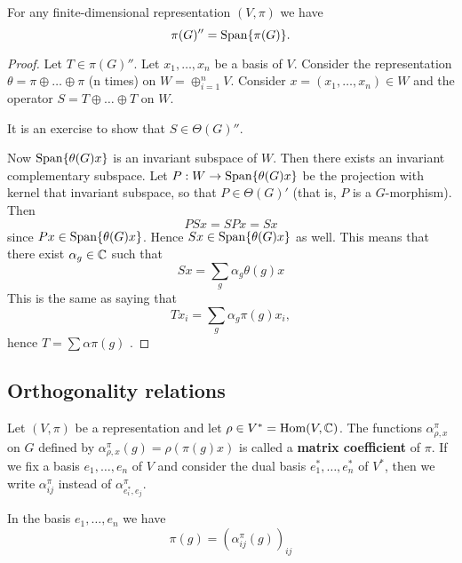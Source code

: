 \documentclass[11pt, english]{article}
\begin{document}
\begin{thm} 
 For any finite-dimensional representation $(V,\pi)$ we have 
\[
\pi(G)'' = \mathrm{Span}\{\pi(G)\}.
\]
\end{thm}
\begin{proof}
Let $T \in \pi(G)''$. Let $x_1,\ldots,x_n$ be a basis of $V$. Consider the representation $\theta = \pi \oplus \ldots \oplus \pi$ (n times) on $W = \oplus_{i=1}^n V$. Consider $x=(x_1,\ldots,x_n) \in W$ and the operator $S = T \oplus \ldots \oplus T$ on $W$. 

It is an exercise to show that $S \in \Theta(G)''$.

Now $\mathrm{Span}\{\theta (G) x \}$ is an invariant subspace of $W$. Then there exists an invariant complementary subspace. Let $P:W \to \mathrm{Span}\{\theta(G)x\}$ be the projection with kernel that invariant subspace, so that $P \in \Theta(G)'$ (that is, $P$ is a $G$-morphism). Then
$$
PSx = SPx = Sx
$$
since $P x \in \mathrm{Span}\{\theta(G)x\}$. Hence $Sx \in \mathrm{Span}\{ \theta(G)x \}$ as well. This means that there exist $\alpha_g \in \mathbb{C}$ such that
$$
Sx = \sum_g \alpha_g \theta(g)x
$$
This is the same as saying that
$$
Tx_i = \sum_g \alpha_g \pi(g)x_i,
$$
hence $T = \sum \alpha \pi(g)$ .
\end{proof}


\subsection{Orthogonality relations}

Let $(V,\pi)$ be a representation and let $\rho \in V^\ast = \operatorname{Hom}(V,\mathbb{C})$. The functions $\alpha_{\rho,x}^\pi$ on $G$ defined by $\alpha_{\rho,x}^\pi(g)=\rho(\pi(g)x)$ is called a \textbf{matrix coefficient} of $\pi$. If we fix a basis $e_1,\ldots,e_n$ of $V$ and consider the dual basis $e_1^\ast,\ldots, e_n^\ast$ of $V^\ast$, then we write $\alpha_{ij}^\pi$ instead of $\alpha_{e_i^\ast,e_j}^\pi$.

In the basis $e_1,\ldots,e_n$ we have
$$
\pi(g) = \left( \alpha_{ij}^\pi(g) \right)_{ij}
$$
\end{document}
